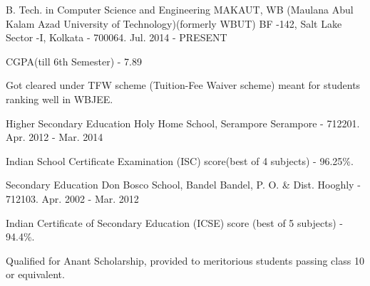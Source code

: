 


\begin{cventries}


\cventry
{B. Tech.  in Computer Science and Engineering} %
{MAKAUT, WB (Maulana Abul Kalam Azad University of Technology)\newline (formerly WBUT)} %
{BF -142, Salt Lake Sector -I, \newline
Kolkata - 700064.} %
{Jul. 2014 - PRESENT} %
{ %
\begin{cvitems}
\item {CGPA(till 6th Semester) - 7.89}
\item {Got cleared under TFW scheme (Tuition-Fee Waiver scheme) meant for students ranking well in WBJEE.}
\end{cvitems}
}


\cventry
{Higher Secondary Education} %
{Holy Home School, Serampore} %
{Serampore - 712201.} %
{Apr. 2012 - Mar. 2014} %
{ %
\begin{cvitems}
\item {Indian School Certificate Examination (ISC) score(best of 4 subjects) - 96.25\%.}
\end{cvitems}
}


\cventry
{Secondary Education} %
{Don Bosco School, Bandel} %
{Bandel, P. O. \& Dist. Hooghly - 712103.} %
{Apr. 2002 - Mar. 2012} %
{ %
\begin{cvitems}
\item {Indian Certificate of Secondary Education (ICSE) score (best of 5 subjects) - 94.4\%.}
\item {Qualified for Anant Scholarship, provided to meritorious students passing class 10 or equivalent.}
\end{cvitems}
}


\end{cventries}